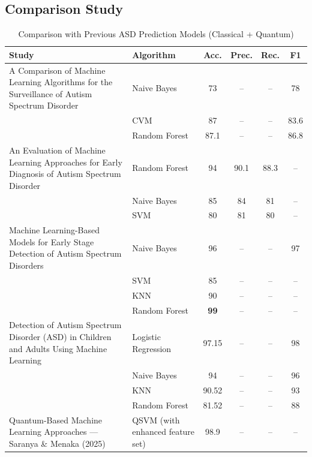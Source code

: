 \documentclass[runningheads]{llncs}
\begin{document}
\subsection{Comparison Study}\label{sec:results}
\begin{table}[ht!]
    \centering
    \caption{Comparison with Previous ASD Prediction Models (Classical + Quantum)}
    \renewcommand{\arraystretch}{1.3}
    \setlength{\tabcolsep}{6pt}
    \begin{tabular}{|p{5.5cm}|p{2.5cm}|c|c|c|c|}
        \hline
            \textbf{Study} & \textbf{Algorithm} & \textbf{Acc.} & \textbf{Prec.} & \textbf{Rec.} & \textbf{F1} \\
            \hline
            A Comparison of Machine Learning Algorithms for the Surveillance of Autism Spectrum Disorder \cite{lee2020} 
            & Naive Bayes     & 73    & --    & --    & 78   \\
            & CVM              & 87    & --    & --    & 83.6 \\
            & Random Forest    & 87.1  & --    & --    & 86.8 \\
            \hline
            An Evaluation of Machine Learning Approaches for Early Diagnosis of Autism Spectrum Disorder
            & Random Forest    & 94    & 90.1  & 88.3  & --   \\
            & Naive Bayes      & 85    & 84    & 81    & --   \\
            & SVM              & 80    & 81    & 80    & --   \\
            \hline
            Machine Learning-Based Models for Early Stage Detection of Autism Spectrum Disorders
            & Naive Bayes      & 96    & --    & --    & 97   \\
            & SVM              & 85    & --    & --    & --   \\
            & KNN              & 90    & --    & --    & --   \\
            & Random Forest    & \textbf{99} & -- & -- & --   \\
            \hline
            Detection of Autism Spectrum Disorder (ASD) in Children and Adults Using Machine Learning
            & Logistic Regression & 97.15 & -- & -- & 98   \\
            & Naive Bayes         & 94    & -- & -- & 96   \\
            & KNN                 & 90.52 & -- & -- & 93   \\
            & Random Forest       & 81.52 & -- & -- & 88   \\
            \hline
            Quantum-Based Machine Learning Approaches --- Saranya \& Menaka (2025) \cite{saranya2025}
            & QSVM (with enhanced feature set) & 98.9 & -- & -- & -- \\

            \hline
    \end{tabular}
    \label{tab:Comparative_Studies}
\end{table}
\end{document}
